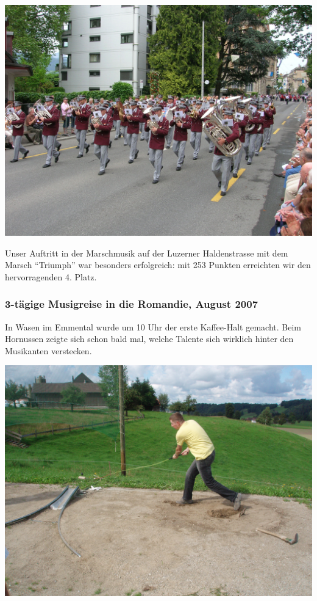 \begin{history}
    \begin{MulticolFigure}
        \centering
        \includegraphics[width=0.93\linewidth]{./chap/2001-2024/2006/Marschmusik.jpg}
    \end{MulticolFigure}

    Unser Auftritt in der Marschmusik auf der Luzerner Haldenstrasse mit dem
    Marsch \enquote{Triumph} war besonders erfolgreich: mit 253 Punkten
    erreichten wir den hervorragenden 4. Platz.

    \vfill
    \columnbreak

    \subsubsection*{3-tägige Musigreise in die Romandie, August 2007}

    In Wasen im Emmental wurde um 10 Uhr der erste Kaffee-Halt gemacht. Beim
    Hornussen zeigte sich schon bald mal, welche Talente sich wirklich hinter
    den Musikanten verstecken.

    \begin{MulticolFigure}
        \centering
        \includegraphics[width=0.93\linewidth]{./chap/2001-2024/2007/Max-am-Hornussen.jpg}
    \end{MulticolFigure}


\end{history}
